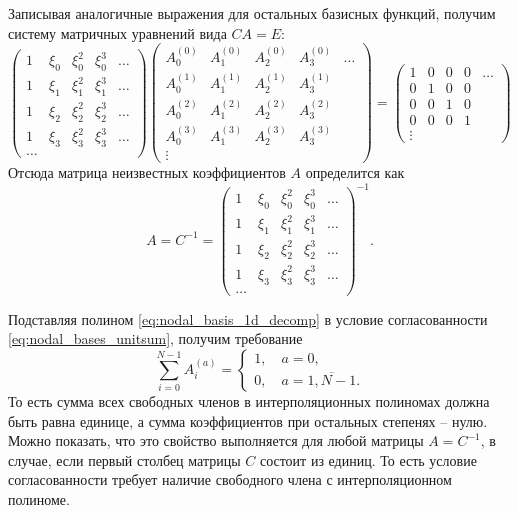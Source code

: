 Записывая аналогичные выражения для остальных базисных функций, получим систему матричных уравнений
вида $C A = E$:
\begin{equation*}
\left(
\begin{array}{ccccc}
1 & \xi_0 & \xi_0^2 & \xi_0^3 & \ldots \\[5pt]
1 & \xi_1 & \xi_1^2 & \xi_1^3 & \ldots \\[5pt]
1 & \xi_2 & \xi_2^2 & \xi_2^3 & \ldots \\[5pt]
1 & \xi_3 & \xi_3^2 & \xi_3^3 & \ldots \\[5pt]
\ldots &&&&
\end{array}
\right)
\left(
\begin{array}{ccccc}
A_0^{(0)} & A_1^{(0)} & A_2^{(0)} & A_3^{(0)} & \ldots\\[5pt]
A_0^{(1)} & A_1^{(1)} & A_2^{(1)} & A_3^{(1)} &       \\[5pt]
A_0^{(2)} & A_1^{(2)} & A_2^{(2)} & A_3^{(2)} &       \\[5pt]
A_0^{(3)} & A_1^{(3)} & A_2^{(3)} & A_3^{(3)} &       \\[5pt]
\vdots
\end{array}
\right)
=
\left(
\begin{array}{ccccc}
1 & 0 & 0 & 0 & \ldots \\[5pt]
0 & 1 & 0 & 0 &        \\[5pt]
0 & 0 & 1 & 0 &        \\[5pt]
0 & 0 & 0 & 1 &        \\[5pt]
\vdots
\end{array}
\right)
\end{equation*}
Отсюда матрица неизвестных коэффициентов $A$ определится как
\begin{equation}
\label{eq:nodal_basic_amat}
A = C^{-1} = 
\left(
\begin{array}{ccccc}
1 & \xi_0 & \xi_0^2 & \xi_0^3 & \ldots \\[5pt]
1 & \xi_1 & \xi_1^2 & \xi_1^3 & \ldots \\[5pt]
1 & \xi_2 & \xi_2^2 & \xi_2^3 & \ldots \\[5pt]
1 & \xi_3 & \xi_3^2 & \xi_3^3 & \ldots \\[5pt]
\ldots &&&&
\end{array}
\right) ^{-1}.
\end{equation}

Подставляя полином \cref{eq:nodal_basis_1d_decomp} в условие согласованности \cref{eq:nodal_bases_unitsum},
получим требование
\begin{equation*}
\sum_{i=0}^{N-1} A_i^{(a)} = 
\begin{cases}
1, \quad a=0, \\
0, \quad a=\overline{1,N-1}.
\end{cases}
\end{equation*} 
То есть сумма всех свободных членов в интерполяционных полиномах должна
быть равна единице, а сумма коэффициентов при остальных степенях -- нулю.
Можно показать, что это свойство выполняется для любой матрицы $A=C^{-1}$,
в случае, если первый столбец матрицы $C$ состоит из единиц.
То есть условие согласованности требует наличие свободного члена
с интерполяционном полиноме.



